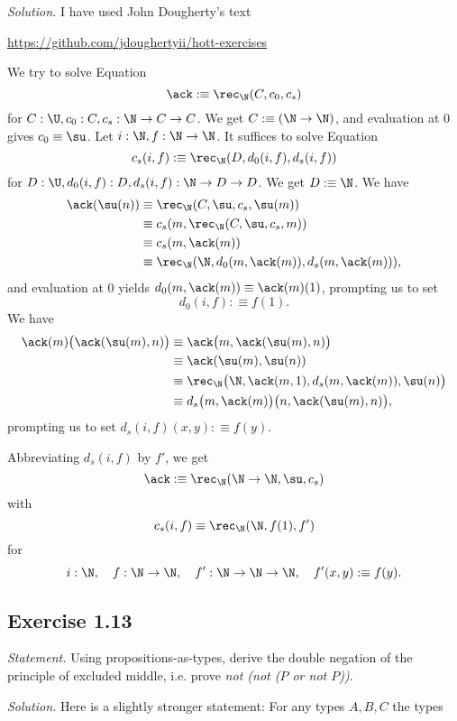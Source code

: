 \documentclass[12pt]{article}
\begin{document}
\nn\emph{Solution.} I have used John Dougherty's text 

\nn\href{https://github.com/jdoughertyii/hott-exercises}{https://github.com/jdoughertyii/hott-exercises}

We try to solve Equation 
\begin{equation}\label{ack1}
\ack:\equiv\rec_\N(C,c_0,c_s)
\end{equation}
for $C:\U,c_0:C,c_s:\N\to C\to C$. We get $C:\equiv(\N\to\N)$, and evaluation at 0 gives $c_0\equiv\su$. Let $i:\N,f:\N\to\N$. It suffices to solve Equation 
\begin{equation}\label{ack2}
c_s(i,f):\equiv\rec_\N(D,d_0(i,f),d_s(i,f))
\end{equation}
for $D:\U,d_0(i,f):D,d_s(i,f):\N\to D\to D$. We get $D:\equiv\N$. We have
\begin{align*}
\ack(\su(n))&\equiv\rec_\N(C,\su,c_s,\su(m))\\
&\equiv c_s(m,\rec_\N(C,\su,c_s,m))\\
&\equiv c_s(m,\ack(m))\\
&\equiv\rec_\N(\N,d_0(m,\ack(m)),d_s(m,\ack(m))),
\end{align*}
and evaluation at 0 yields $d_0(m,\ack(m))\equiv\ack(m)(1)$, prompting us to set $$d_0(i,f):\equiv f(1).$$ We have 
\begin{align*}
\ack(m)\big(\ack(\su(m),n)\big)&\equiv\ack\big(m,\ack(\su(m),n)\big)\\ 
&\equiv\ack(\su(m),\su(n))\\ 
&\equiv\rec_\N\big(\N,\ack(m,1),d_s(m,\ack(m)),\su(n)\big)\\
&\equiv d_s\big(m,\ack(m)\big)\big(n,\ack(\su(m),n)\big),
\end{align*}
prompting us to set $d_s(i,f)(x,y):\equiv f(y)$. 

Abbreviating $d_s(i,f)$ by $f'$, we get 
$$
\ack:\equiv\rec_\N(\N\to\N,\su,c_s)
$$ 
with 
$$ 
c_s(i,f)\equiv\rec_\N(\N,f(1),f')
$$ 
for 
$$ 
i:\N,\quad f:\N\to\N,\quad f':\N\to\N\to\N,\quad f'(x,y):\equiv f(y).
$$


\subsection{Exercise 1.13}

\emph{Statement.} Using propositions-as-types, derive the double negation of the principle of excluded middle, i.e. prove \emph{not (not ($P$ or not $P$))}.

\nn\emph{Solution.} Here is a slightly stronger statement: For any types $A,B,C$ the types
\end{document}

